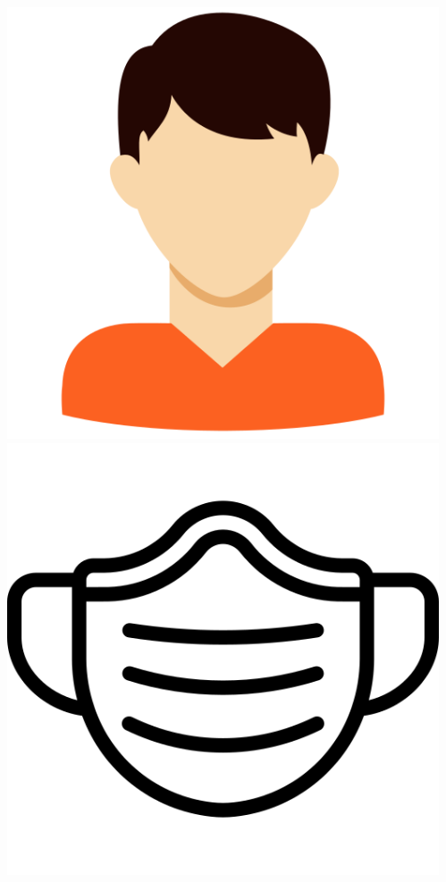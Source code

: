 \documentclass{beamer}
\begin{document}
\begin{CJK*}{UTF8}{bsmi}
\begin{frame}
\begin{columns}
\begin{column}{0.30\textwidth}
            \end{column}
            \begin{column}{0.30\textwidth}
                \centering
                \includegraphics[height=0.3\textheight]{man.png}\\
                \includegraphics[width=\textwidth, height=0.3\textheight]{mask.png}\\

\end{column}
\end{columns}
\end{frame}
\end{CJK*}
\end{document}
